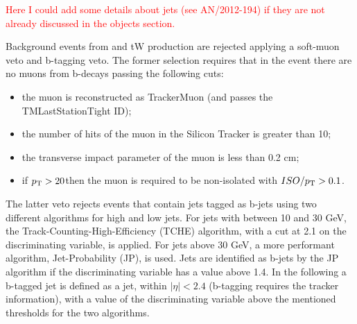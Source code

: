 \textcolor{red}{Here I could add some details about jets (see AN/2012-194) if they are not already discussed in the objects section.}

Background events from \ttbar and tW production are rejected applying a soft-muon veto and b-tagging veto. The former selection requires that in the event there are no muons from b-decays passing the following cuts: 
\begin{itemize}
\item the muon is reconstructed as TrackerMuon (and passes the TMLastStationTight ID);
\item the number of hits of the muon in the Silicon Tracker is greater than 10;
\item the transverse impact parameter of the muon is less than 0.2 cm;
\item if $p_\mathrm{T} > 20$\GeV then the muon is required to be non-isolated with $ISO/p_\mathrm{T} > 0.1$.
\end{itemize}

The latter veto rejects events that contain jets tagged as b-jets using two different algorithms for high and low \pt jets. For jets with \pt between 10 and 30 GeV, the Track-Counting-High-Efficiency (TCHE) algorithm, with a cut at 2.1 on the discriminating variable, is applied.
For jets above 30 GeV, a more performant algorithm, Jet-Probability (JP), is used. Jets are identified as b-jets by the JP algorithm if the discriminating variable has a value above 1.4.
In the following a b-tagged jet is defined as a jet, within $|\eta|<2.4$ (b-tagging requires the tracker information), with a value of the discriminating variable above the mentioned thresholds for the two algorithms.  


